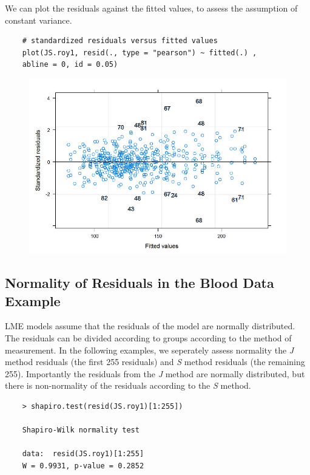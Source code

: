 \documentclass[Main.tex]{subfiles}
\begin{document}
We can plot the residuals against the fitted values, to assess the assumption of constant variance. 
\begin{framed}
	\begin{verbatim}
	# standardized residuals versus fitted values 
	plot(JS.roy1, resid(., type = "pearson") ~ fitted(.) , 
	abline = 0, id = 0.05)
	\end{verbatim}
\end{framed}
\begin{figure}[h!]
	\centering
	\includegraphics[width=0.9\linewidth]{images/Residuals-JS-Roy}
	\caption{}
	\label{fig:Residuals-JS-Roy}
\end{figure}

\subsection{Normality of Residuals in the Blood Data Example}
LME models assume that the residuals of the model are normally distributed.  The residuals can be divided according to groups according to the method of measurement. In the following examples, we seperately assess normality the \textit{J} method residuals (the first 255 residuals) and \textit{S} method residuals (the remaining 255). Importantly the residuals from the \textit{J} method are normally distributed, but there is non-normality of the residuals according to the \textit{S} method.
\begin{framed}
	\begin{verbatim}
	> shapiro.test(resid(JS.roy1)[1:255])
	
	Shapiro-Wilk normality test
	
	data:  resid(JS.roy1)[1:255]
	W = 0.9931, p-value = 0.2852
	\end{verbatim}
\end{framed}
\end{document}
